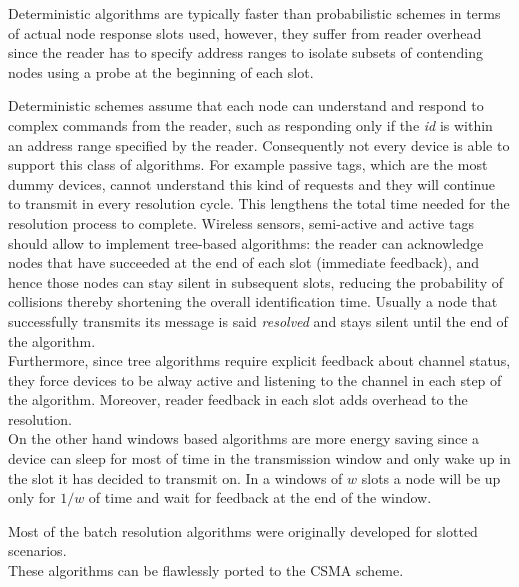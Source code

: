 \documentclass[11pt,a4paper,twoside,openright]{book}
\newcommand{\rev}[1]{\textcolor{Cerulean}{#1}}
\begin{document}
Deterministic algorithms are typically faster than probabilistic schemes in terms of actual node response slots used, however, they suffer from reader overhead since the reader has to specify address ranges to isolate  subsets of contending nodes using a probe at the beginning of each slot.

Deterministic schemes assume that each node can understand and respond to complex commands from the reader, such as responding only if the \emph{id} is within an address range specified by the reader. Consequently not every device is able to support this class of algorithms. For example passive tags, which are the most dummy devices, cannot understand this kind of requests and they will continue to transmit in every resolution cycle. This lengthens the total time needed for the resolution process to complete. Wireless sensors, semi-active and active tags should allow to implement tree-based algorithms: the reader can acknowledge nodes that have succeeded at the end of each slot (immediate feedback), and hence those nodes can stay silent in subsequent slots, reducing the probability of collisions thereby shortening the overall identification time. Usually a node that successfully transmits its message is said \emph{resolved} and stays silent until the end of the algorithm.\\
Furthermore, since tree algorithms require explicit feedback about channel status, they force devices to be alway active and listening to the channel in each step of the algorithm. 
\rev{Moreover, reader feedback in each slot adds overhead to the resolution.}\\
On the other hand windows based algorithms are more energy saving since a device can sleep for most of time in the transmission window and only wake up in the slot it has decided to transmit on. In a windows of $w$ slots  a node will be up only for $1/w$ of time and wait for feedback at the end of the window.


Most of the batch resolution algorithms  were originally developed for slotted scenarios.\\
These algorithms can be flawlessly ported to the CSMA scheme.
 
\end{document}
